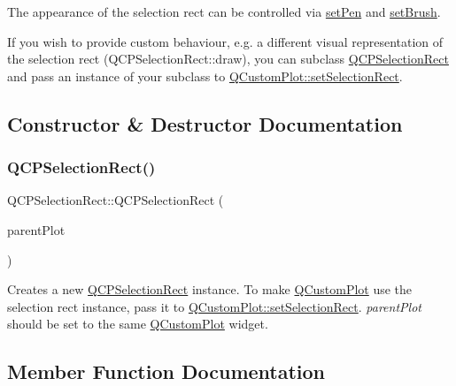 The appearance of the selection rect can be controlled via \hyperlink{class_q_c_p_selection_rect_ada20b7fb1b2dcbe50523262636b06963}{set\+Pen} and \hyperlink{class_q_c_p_selection_rect_ab0c66f1484418782efa01f4153611080}{set\+Brush}.

If you wish to provide custom behaviour, e.\+g. a different visual representation of the selection rect (Q\+C\+P\+Selection\+Rect\+::draw), you can subclass \hyperlink{class_q_c_p_selection_rect}{Q\+C\+P\+Selection\+Rect} and pass an instance of your subclass to \hyperlink{class_q_custom_plot_a0c09f96df15faa4799ad7051bb16cf33}{Q\+Custom\+Plot\+::set\+Selection\+Rect}. 

\subsection{Constructor \& Destructor Documentation}
\mbox{\label{class_q_c_p_selection_rect_ade6ee59fabcc585a1e281eb527b01867}} 
\subsubsection{\texorpdfstring{Q\+C\+P\+Selection\+Rect()}{QCPSelectionRect()}}
{\footnotesize\ttfamily Q\+C\+P\+Selection\+Rect\+::\+Q\+C\+P\+Selection\+Rect (\begin{DoxyParamCaption}\item[{\hyperlink{class_q_custom_plot}{Q\+Custom\+Plot} $\ast$}]{parent\+Plot }\end{DoxyParamCaption})\hspace{0.3cm}{\ttfamily [explicit]}}

Creates a new \hyperlink{class_q_c_p_selection_rect}{Q\+C\+P\+Selection\+Rect} instance. To make \hyperlink{class_q_custom_plot}{Q\+Custom\+Plot} use the selection rect instance, pass it to \hyperlink{class_q_custom_plot_a0c09f96df15faa4799ad7051bb16cf33}{Q\+Custom\+Plot\+::set\+Selection\+Rect}. {\itshape parent\+Plot} should be set to the same \hyperlink{class_q_custom_plot}{Q\+Custom\+Plot} widget. 

\subsection{Member Function Documentation}
\mbox{\label{class_q_c_p_selection_rect_a15a43542e1f7b953a44c260b419e6d2c}} 
